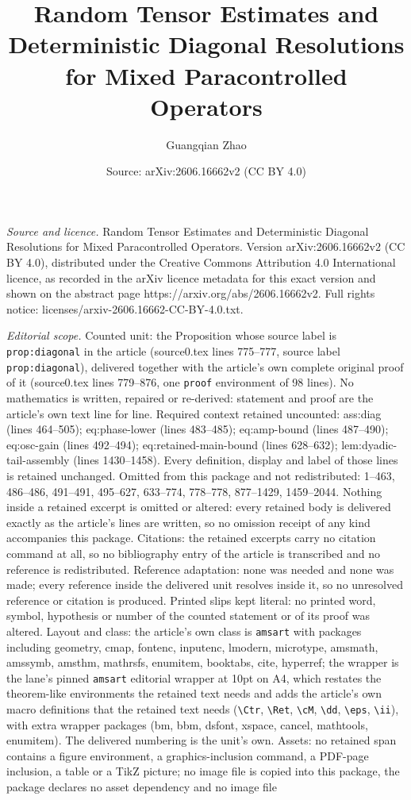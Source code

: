 \documentclass[10pt,a4paper]{amsart}
\title[Random Tensor Estimates and Deterministic Diagonal Resolutio]{Random Tensor Estimates and Deterministic Diagonal Resolutions for Mixed Paracontrolled Operators}
\author{Guangqian Zhao}
\date{Source: arXiv:2606.16662v2 (CC BY 4.0)}
\begin{document}
\maketitle

\noindent\emph{Source and licence.} Random Tensor Estimates and Deterministic Diagonal Resolutions for Mixed Paracontrolled Operators. Version arXiv:2606.16662v2 (CC BY 4.0), distributed under the Creative Commons Attribution 4.0 International licence, as recorded in the arXiv licence metadata for this exact version and shown on the abstract page https://arxiv.org/abs/2606.16662v2. Full rights notice: licenses/arxiv-2606.16662-CC-BY-4.0.txt.\par\smallskip

\noindent\textit{Editorial scope.} Counted unit: the Proposition whose source label is \texttt{prop:diagonal} in the article (source0.tex lines 775--777, source label \texttt{prop:diagonal}), delivered together with the article's own complete original proof of it (source0.tex lines 779--876, one \texttt{proof} environment of 98 lines). No mathematics is written, repaired or re-derived: statement and proof are the article's own text line for line. Required context retained uncounted: ass:diag (lines 464--505); eq:phase-lower (lines 483--485); eq:amp-bound (lines 487--490); eq:osc-gain (lines 492--494); eq:retained-main-bound (lines 628--632); lem:dyadic-tail-assembly (lines 1430--1458). Every definition, display and label of those lines is retained unchanged. Omitted from this package and not redistributed: 1--463, 486--486, 491--491, 495--627, 633--774, 778--778, 877--1429, 1459--2044. Nothing inside a retained excerpt is omitted or altered: every retained body is delivered exactly as the article's lines are written, so no omission receipt of any kind accompanies this package. Citations: the retained excerpts carry no citation command at all, so no bibliography entry of the article is transcribed and no reference is redistributed. Reference adaptation: none was needed and none was made; every reference inside the delivered unit resolves inside it, so no unresolved reference or citation is produced. Printed slips kept literal: no printed word, symbol, hypothesis or number of the counted statement or of its proof was altered. Layout and class: the article's own class is \texttt{amsart} with packages including geometry, cmap, fontenc, inputenc, lmodern, microtype, amsmath, amssymb, amsthm, mathrsfs, enumitem, booktabs, cite, hyperref; the wrapper is the lane's pinned \texttt{amsart} editorial wrapper at 10pt on A4, which restates the theorem-like environments the retained text needs and adds the article's own macro definitions that the retained text needs (\texttt{\textbackslash Ctr}, \texttt{\textbackslash Ret}, \texttt{\textbackslash cM}, \texttt{\textbackslash dd}, \texttt{\textbackslash eps}, \texttt{\textbackslash ii}), with extra wrapper packages (bm, bbm, dsfont, xspace, cancel, mathtools, enumitem). The delivered numbering is the unit's own. Assets: no retained span contains a figure environment, a graphics-inclusion command, a PDF-page inclusion, a table or a TikZ picture; no image file is copied into this package, the package declares no asset dependency and no image file 
\end{document}
